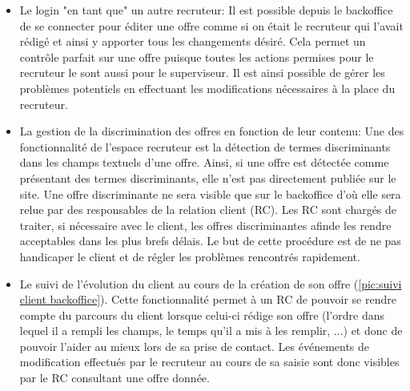 \begin{itemize}
  \item Le login "en tant que" un autre recruteur:
  Il est possible depuis le backoffice de se connecter pour éditer une offre comme si on était le recruteur qui l'avait rédigé et ainsi y apporter tous les changements désiré.
  Cela permet un contrôle parfait sur une offre puisque toutes les actions permises pour le recruteur le sont aussi pour le superviseur.
  Il est ainsi possible de gérer les problèmes potentiels en effectuant les modifications nécessaires à la place du recruteur.
  \item La gestion de la discrimination des offres en fonction de leur contenu:
  Une des fonctionnalité de l'espace recruteur est la détection de termes discriminants dans les champs textuels d'une offre.
  Ainsi, si une offre est détectée comme présentant des termes discriminants, elle n'est pas directement publiée sur le site.
  Une offre discriminante ne sera visible que sur le backoffice d'où elle sera relue par des responsables de la relation client (RC).
  Les RC sont chargés de traiter, si nécessaire avec le client, les offres discriminantes afinde les rendre acceptables dans les plus brefs délais.
  Le but de cette procédure est de ne pas handicaper le client et de régler les problèmes rencontrés rapidement.
  \item Le suivi de l'évolution du client au cours de la création de son offre (\ref{pic:suivi client backoffice}).
  Cette fonctionnalité permet à un RC de pouvoir se rendre compte du parcours du client lorsque celui-ci rédige son offre (l'ordre dans lequel il a rempli les champs, le temps qu'il a mis à les remplir, ...) et donc de pouvoir l'aider au mieux lors de sa prise de contact.
  Les événements de modification effectués par le recruteur au cours de sa saisie sont donc visibles par le RC consultant une offre donnée.
\end{itemize}

